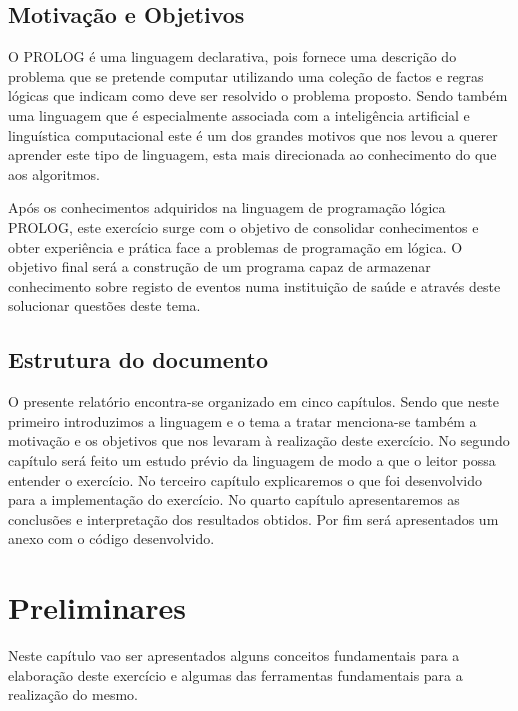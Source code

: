 \section{Motivação e Objetivos}
\label{p1:MotivObj}
O PROLOG é uma linguagem declarativa, pois fornece uma descrição do problema que se pretende computar utilizando uma coleção de factos e regras lógicas que indicam como deve ser resolvido o problema proposto. Sendo também uma linguagem que é especialmente associada com a inteligência artificial e linguística computacional este é um dos grandes motivos que nos levou a querer aprender este tipo de linguagem, esta mais direcionada ao conhecimento do que aos algoritmos. 


Após os conhecimentos adquiridos na linguagem de programação lógica PROLOG, este exercício surge com o objetivo de consolidar conhecimentos e obter experiência e prática face a problemas de programação em lógica. O objetivo final será a construção de um programa capaz de armazenar conhecimento sobre registo de eventos numa instituição de saúde e através deste solucionar questões deste tema.



\section{Estrutura do documento}
\label{p1:Estrutura}
O presente relatório encontra-se organizado em cinco capítulos. Sendo que neste primeiro introduzimos a linguagem e o tema a tratar menciona-se também a motivação e os objetivos que nos levaram à realização deste exercício. 
No segundo capítulo será feito um estudo prévio da linguagem de modo a que o leitor possa entender o exercício. No terceiro capítulo explicaremos o que foi desenvolvido para a implementação do exercício. No quarto capítulo apresentaremos as conclusões e interpretação dos resultados obtidos. Por fim será apresentados um anexo com o código desenvolvido. 




\chapter{Preliminares}
\label{cap:p2}
Neste capítulo vao ser apresentados alguns conceitos fundamentais para a elaboração deste
exercício e algumas das ferramentas fundamentais para a realização do mesmo.


